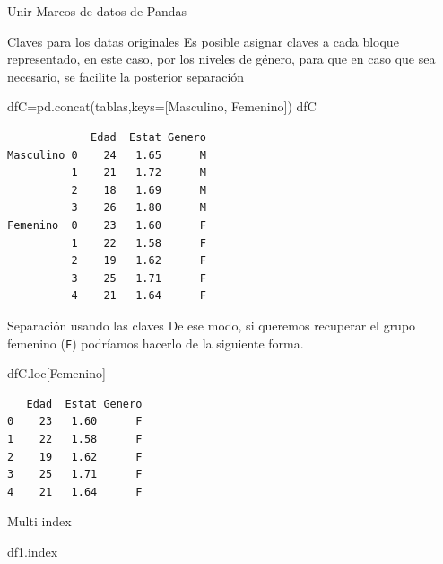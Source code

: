 \documentclass[
  ignorenonframetext,
  aspectratio=169,
  spanish,
]{beamer}
\newenvironment{Shaded}{\begin{snugshade}}{\end{snugshade}}
\newcommand{\NormalTok}[1]{\textcolor[rgb]{0.00,0.23,0.31}{#1}}
\newcommand{\OperatorTok}[1]{\textcolor[rgb]{0.37,0.37,0.37}{#1}}
\newcommand{\StringTok}[1]{\textcolor[rgb]{0.13,0.47,0.30}{#1}}
\begin{document}
\begin{frame}[fragile]{Unir Marcos de datos de Pandas}
\begin{block}{Claves para los datas originales}
\label{claves-para-los-datas-originales}
Es posible asignar claves a cada bloque representado, en este caso, por
los niveles de género, para que en caso que sea necesario, se facilite
la posterior separación

\begin{Shaded}
\begin{Highlighting}[]
\NormalTok{dfC}\OperatorTok{=}\NormalTok{pd.concat(tablas,keys}\OperatorTok{=}\NormalTok{[}\StringTok{\textquotesingle{}Masculino\textquotesingle{}}\NormalTok{, }\StringTok{\textquotesingle{}Femenino\textquotesingle{}}\NormalTok{])}
\NormalTok{dfC}
\end{Highlighting}
\end{Shaded}

\begin{verbatim}
             Edad  Estat Genero
Masculino 0    24   1.65      M
          1    21   1.72      M
          2    18   1.69      M
          3    26   1.80      M
Femenino  0    23   1.60      F
          1    22   1.58      F
          2    19   1.62      F
          3    25   1.71      F
          4    21   1.64      F
\end{verbatim}
\end{block}

\begin{block}{Separación usando las claves}
\label{separaciuxf3n-usando-las-claves}
De ese modo, si queremos recuperar el grupo femenino (\texttt{F})
podríamos hacerlo de la siguiente forma.

\begin{Shaded}
\begin{Highlighting}[]
\NormalTok{dfC.loc[}\StringTok{\textquotesingle{}Femenino\textquotesingle{}}\NormalTok{]}
\end{Highlighting}
\end{Shaded}

\begin{verbatim}
   Edad  Estat Genero
0    23   1.60      F
1    22   1.58      F
2    19   1.62      F
3    25   1.71      F
4    21   1.64      F
\end{verbatim}
\end{block}

\begin{block}{Multi index}
\label{multi-index}
\begin{Shaded}
\begin{Highlighting}[]
\NormalTok{df1.index}
\end{Highlighting}
\end{Shaded}


\end{block}
\end{frame}
\end{document}
